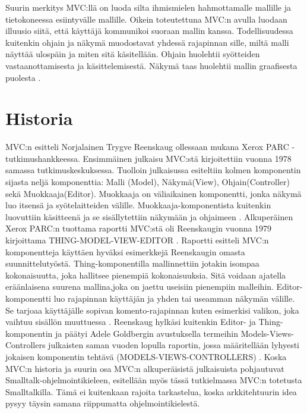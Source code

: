 \documentclass[utf8]{gradu3}
\begin{document}
Suurin merkitys MVC:llä on luoda silta ihmismielen hahmottamalle mallille ja tietokoneessa esiintyvälle mallille. Oikein toteutettuna MVC:n avulla luodaan illuusio siitä, että käyttäjä kommunikoi suoraan mallin kanssa. Todellisuudessa kuitenkin ohjain ja näkymä muodostavat yhdessä rajapinnan sille, miltä malli näyttää ulospäin ja miten sitä käsitellään. Ohjain huolehtii syötteiden vastaanottamisesta ja käsittelemisestä. Näkymä taas huolehtii mallin graafisesta puolesta \parencite[s. 11-12]{reenskaug_tools}. 

\section{Historia}
MVC:n esitteli Norjalainen Trygve Reenskaug ollessaan mukana Xerox PARC -tutkimushankkeessa. 
Ensimmäinen julkaisu MVC:stä kirjoitettiin vuonna 1978 samassa tutkimuskeskuksessa. 
Tuolloin julkaisussa esiteltiin kolmen komponentin sijasta neljä komponenttia: 
Malli (Model), Näkymä(View), Ohjain(Controller) sekä Muokkaaja(Editor). Muokkaaja on 
väliaikainen komponentti, jonka näkymä luo itsensä ja syötelaitteiden välille. 
Muokkaaja-komponentista kuitenkin luovuttiin käsitteenä ja se sisällytettiin näkymään 
ja ohjaimeen \parencite{xerox}. Alkuperäinen Xerox PARC:n tuottama raportti MVC:stä oli Reenskaugin 
vuonna 1979 kirjoittama THING-MODEL-VIEW-EDITOR \parencite{xerox-thing}. Raportti esitteli MVC:n 
komponentteja käyttäen hyväksi esimerkkejä Reenskaugin omasta suunnittelutyöstä. Thing-komponentilla mallinnettiin
jotakin isompaa kokonaisuutta, joka hallitsee pienempiä kokonaisuuksia. Sitä voidaan ajatella eräänlaisena suurena mallina,joka on jaettu useisiin pienempiin malleihin. Editor-komponentti luo rajapinnan käyttäjän ja yhden tai useamman näkymän välille. Se tarjoaa käyttäjälle sopivan komento-rajapinnan kuten esimerkisi valikon, joka vaihtuu sisällön muuttuessa \parencite{xerox-thing}. Reenskaug hylkäsi kuitenkin Editor- ja Thing-komponentin ja  päätyi Adele Goldbergin avustuksella termeihin Models-Views-Controllers julkaisten saman vuoden lopulla raportin, jossa määritellään lyhyesti jokaisen komponentin tehtävä (MODELS-VIEWS-CONTROLLERS) \parencite{xerox-original}. Koska MVC:n historia ja suurin osa MVC:n alkuperäisistä julkaisuista pohjautuvat Smalltalk-ohjelmointikieleen, esitellään myös tässä tutkielmassa MVC:n totetusta Smalltalkilla.
Tämä ei kuitenkaan rajoita tarkastelua, koska arkkitehtuurin idea pysyy täysin samana riippumatta ohjelmointikielestä.
\end{document}
